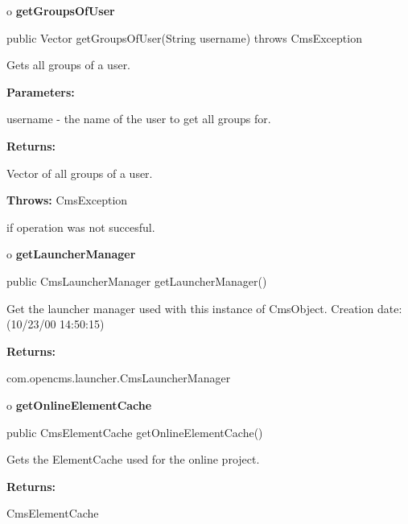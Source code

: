 o {\bf getGroupsOfUser} 

\begin{PRE}
 public Vector getGroupsOfUser(String username) throws CmsException
\end{PRE}

\begin{description}
\htmlDD Gets all groups of a user. 

\begin{description}
\item {\bf Parameters:}  

username - the name of the user to get all groups for.  
\item {\bf Returns:}  

Vector of all groups of a user.  
\item {\bf Throws:} CmsException  

if operation was not succesful.  
\end{description}

\end{description}

o {\bf getLauncherManager} 

\begin{PRE}
 public CmsLauncherManager getLauncherManager()
\end{PRE}

\begin{description}
\htmlDD Get the launcher manager used with this instance of CmsObject.
Creation date: (10/23/00 14:50:15) 

\begin{description}
\item {\bf Returns:}  

com.opencms.launcher.CmsLauncherManager  
\end{description}

\end{description}

o {\bf getOnlineElementCache} 

\begin{PRE}
 public CmsElementCache getOnlineElementCache()
\end{PRE}

\begin{description}
\htmlDD Gets the ElementCache used for the online project. 

\begin{description}
\item {\bf Returns:}  

CmsElementCache  
\end{description}

\end{description}

